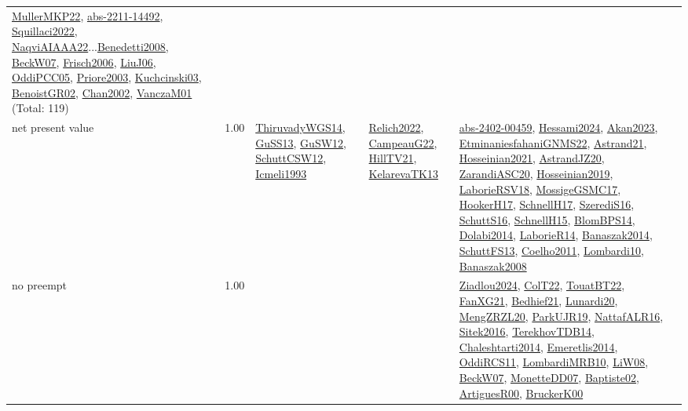 {\begin{longtable}{p{3cm}r>{\raggedright\arraybackslash}p{6cm}>{\raggedright\arraybackslash}p{6cm}>{\raggedright\arraybackslash}p{8cm}}
\hyperref[detail:MullerMKP22]{MullerMKP22}, \hyperref[detail:abs-2211-14492]{abs-2211-14492}, \hyperref[detail:Squillaci2022]{Squillaci2022}, \hyperref[detail:NaqviAIAAA22]{NaqviAIAAA22}...\hyperref[detail:Benedetti2008]{Benedetti2008}, \hyperref[detail:BeckW07]{BeckW07}, \hyperref[detail:Frisch2006]{Frisch2006}, \hyperref[detail:LiuJ06]{LiuJ06}, \hyperref[detail:OddiPCC05]{OddiPCC05}, \hyperref[detail:Priore2003]{Priore2003}, \hyperref[detail:Kuchcinski03]{Kuchcinski03}, \hyperref[detail:BenoistGR02]{BenoistGR02}, \hyperref[detail:Chan2002]{Chan2002}, \hyperref[detail:VanczaM01]{VanczaM01} (Total: 119)\\
\index{net present value}\index{Concepts!net present value}net present value &  1.00 & \hyperref[detail:ThiruvadyWGS14]{ThiruvadyWGS14}, \hyperref[detail:GuSS13]{GuSS13}, \hyperref[detail:GuSW12]{GuSW12}, \hyperref[detail:SchuttCSW12]{SchuttCSW12}, \hyperref[detail:Icmeli1993]{Icmeli1993} & \hyperref[detail:Relich2022]{Relich2022}, \hyperref[detail:CampeauG22]{CampeauG22}, \hyperref[detail:HillTV21]{HillTV21}, \hyperref[detail:KelarevaTK13]{KelarevaTK13} & \hyperref[detail:abs-2402-00459]{abs-2402-00459}, \hyperref[detail:Hessami2024]{Hessami2024}, \hyperref[detail:Akan2023]{Akan2023}, \hyperref[detail:EtminaniesfahaniGNMS22]{EtminaniesfahaniGNMS22}, \hyperref[detail:Astrand21]{Astrand21}, \hyperref[detail:Hosseinian2021]{Hosseinian2021}, \hyperref[detail:AstrandJZ20]{AstrandJZ20}, \hyperref[detail:ZarandiASC20]{ZarandiASC20}, \hyperref[detail:Hosseinian2019]{Hosseinian2019}, \hyperref[detail:LaborieRSV18]{LaborieRSV18}, \hyperref[detail:MossigeGSMC17]{MossigeGSMC17}, \hyperref[detail:HookerH17]{HookerH17}, \hyperref[detail:SchnellH17]{SchnellH17}, \hyperref[detail:SzerediS16]{SzerediS16}, \hyperref[detail:SchuttS16]{SchuttS16}, \hyperref[detail:SchnellH15]{SchnellH15}, \hyperref[detail:BlomBPS14]{BlomBPS14}, \hyperref[detail:Dolabi2014]{Dolabi2014}, \hyperref[detail:LaborieR14]{LaborieR14}, \hyperref[detail:Banaszak2014]{Banaszak2014}, \hyperref[detail:SchuttFS13]{SchuttFS13}, \hyperref[detail:Coelho2011]{Coelho2011}, \hyperref[detail:Lombardi10]{Lombardi10}, \hyperref[detail:Banaszak2008]{Banaszak2008}\\
\index{no preempt}\index{Concepts!no preempt}no preempt &  1.00 &  &  & \hyperref[detail:Ziadlou2024]{Ziadlou2024}, \hyperref[detail:ColT22]{ColT22}, \hyperref[detail:TouatBT22]{TouatBT22}, \hyperref[detail:FanXG21]{FanXG21}, \hyperref[detail:Bedhief21]{Bedhief21}, \hyperref[detail:Lunardi20]{Lunardi20}, \hyperref[detail:MengZRZL20]{MengZRZL20}, \hyperref[detail:ParkUJR19]{ParkUJR19}, \hyperref[detail:NattafALR16]{NattafALR16}, \hyperref[detail:Sitek2016]{Sitek2016}, \hyperref[detail:TerekhovTDB14]{TerekhovTDB14}, \hyperref[detail:Chaleshtarti2014]{Chaleshtarti2014}, \hyperref[detail:Emeretlis2014]{Emeretlis2014}, \hyperref[detail:OddiRCS11]{OddiRCS11}, \hyperref[detail:LombardiMRB10]{LombardiMRB10}, \hyperref[detail:LiW08]{LiW08}, \hyperref[detail:BeckW07]{BeckW07}, \hyperref[detail:MonetteDD07]{MonetteDD07}, \hyperref[detail:Baptiste02]{Baptiste02}, \hyperref[detail:ArtiguesR00]{ArtiguesR00}, \hyperref[detail:BruckerK00]{BruckerK00}\\

\end{longtable}}
